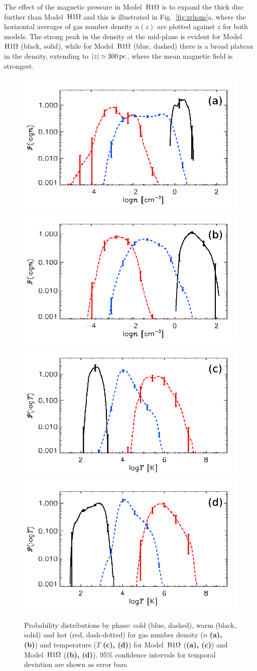 \documentclass[useAMS,usenatbib]{mn2e}
\begin{document}
  The effect of the magnetic pressure in Model~${\mathrm{B}1\rm{\Omega} }$ is to 
  expand the thick disc further than Model~${\mathrm{H}1\rm{\Omega}}$ and this is illustrated in 
  Fig.~\ref{fig:zrhom}a, where the horizontal averages of gas number density
  $n(z)$ are plotted against $z$ for both models. 
  The strong peak in the density at the mid-plane is evident for Model~${\mathrm{H}1\rm{\Omega}}$
  (black, solid), while for Model~${\mathrm{B}1\rm{\Omega} }$ (blue, dashed) there is a broad
  plateau in the density, extending to $|z|\simeq300\,{\rm pc}$, where the mean 
  magnetic field is strongest.
  
  \begin{figure}
  \centering
  \includegraphics[width=0.45\linewidth]{fig/o1pr_npdf3s.png}  
  \includegraphics[width=0.45\linewidth]{fig/o1ph_npdf3s.png}\\  
  \includegraphics[width=0.45\linewidth]{fig/o1pr_tpdf3s.png}
  \includegraphics[width=0.45\linewidth]{fig/o1ph_tpdf3s.png}  
    \caption[Probability distributions by phase for $n$ and $T$]{
  Probability distributions by phase: cold (blue, dashed), warm (black, solid)
  and hot (red, dash-dotted) for gas number density ($n$ {\textbf{(a), (b)}})
  and temperature ($T$ {\textbf{(c), (d)}}) 
  for Model~${\mathrm{B}1\rm{\Omega} }$ ({\textbf{(a), (c)}}) and Model~${\mathrm{H}1\rm{\Omega}}$
  ({\textbf{(b), (d)}}).
  95\% confidence intervals for temporal deviation are shown as error bars.   
  \label{fig:npdf3s}
    }
  \end{figure}
\end{document}

